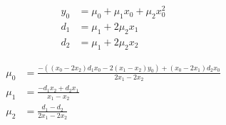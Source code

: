 \begin{align}
  y_0 & = \mu_0+\mu_1 x_0+\mu_2 x_0^{2}  \\
   d_1 & = \mu_1+2 \mu_2 x_1  \\
   d_2 & = \mu_1+2 \mu_2 x_2  
\end{align}

 
\begin{align}
  \mu_0 & = \frac
{ -  \left(  \left( x_0 - 2 x_2 \right)  d_1 x_0 - 2  \left( x_1 - x_2 \right)  y_0  \right) + \left( x_0 - 2 x_1 \right)  d_2 x_0}
{2 x_1 - 2 x_2} \\
   \mu_1 & = \frac
{ - d_1 x_2+d_2 x_1}
{x_1 - x_2} \\
   \mu_2 & = \frac
{d_1 - d_2}
{2 x_1 - 2 x_2} 
\end{align}
